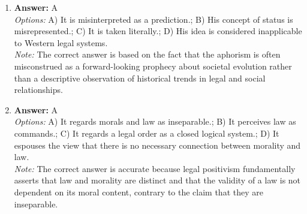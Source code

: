 \documentclass[12pt]{article}
\begin{document}
\begin{enumerate}[label=\arabic*.]
\item \textbf{Answer:} A
\\ \textit{Options:} A) It is misinterpreted as a prediction.; B) His concept of status is misrepresented.; C) It is taken literally.; D) His idea is considered inapplicable to Western legal systems.
\\ \textit{Note:} The correct answer is based on the fact that the aphorism is often misconstrued as a forward-looking prophecy about societal evolution rather than a descriptive observation of historical trends in legal and social relationships.
\item \textbf{Answer:} A
\\ \textit{Options:} A) It regards morals and law as inseparable.; B) It perceives law as commands.; C) It regards a legal order as a closed logical system.; D) It espouses the view that there is no necessary connection between morality and law.
\\ \textit{Note:} The correct answer is accurate because legal positivism fundamentally asserts that law and morality are distinct and that the validity of a law is not dependent on its moral content, contrary to the claim that they are inseparable.
\end{enumerate}
\end{document}
